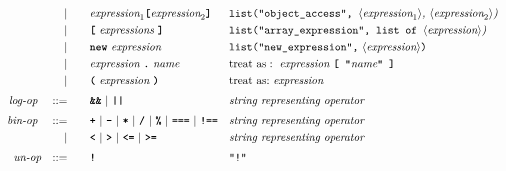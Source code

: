 \begin{alignat*}{9}
&&                       && |   &\quad && \textit{expression}_1 \textbf{\texttt{[}}
                                          \textit{expression}_2 \textbf{\texttt{]}}
                                                           && \texttt{list("object\_access",  } \langle \textit{expression}_1\rangle \textit{,  } \langle \textit{expression}_2\rangle \textit{)} \\
&&                       && |   &\quad &&   \textbf{\texttt{[}}\ 
                                            \textit{expressions}\
                                            \textbf{\texttt{]}}
                                                           && \texttt{list("array\_expression", list of  } \langle \textit{expression}\rangle \textit{)} \\
&&                       && |   &\quad &&  \textbf{\texttt{new}}\ \textit{expression}
                                                           && \texttt{list("new\_expression",}\ \langle  \textit{expression} \rangle \texttt{)} \\
&&                       && |   &\quad &&  \textit{expression}\ \textbf{\texttt{.}}\ \textit{name}
                                                           && \textrm{treat as}:\ \textit{expression}\ \textbf{\texttt{[ "}}\textit{name}\textbf{\texttt{" ]}}  \\
&&                       && |   &\quad &&  \textbf{\texttt{(}}\  \textit{expression} \ 
                                            \textbf{\texttt{)}} && \textrm{treat as:}\ \textit{expression} \\[1mm]
&& \textit{log-op}    \ 
                        && ::= &\quad && \textbf{\texttt{\&\&}}\ |\ \texttt{\textbf{||}}
                                          && \textit{string representing operator} \\[1mm]
&& \textit{bin-op}    \ 
                        && ::= &\quad && \textbf{\texttt{+}}\ |\ \textbf{\texttt{-}}\ |\ \textbf{\texttt{*}}\ |\ \textbf{\texttt{/}}\ |\ \textbf{\texttt{\%}}\ |\ 
                                   \textbf{\texttt{===}}\ |\ \textbf{\texttt{!==}}  && \textit{string representing operator} \\
&&                       && |  &\quad &&  \texttt{\textbf{<}}\ |\ \texttt{\textbf{>}}\ |\ \texttt{\textbf{<=}}\ |\ \texttt{\textbf{>=}}
                                          && \textit{string representing operator} \\[1mm]
&& \textit{un-op}    
                        && ::= &\quad && \textbf{\texttt{!}}
                        && \texttt{"!"} \\

\end{alignat*}
